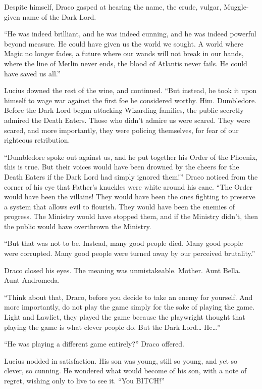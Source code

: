 Despite himself, Draco gasped at hearing the name, the crude, vulgar, Muggle-given name of the Dark Lord.

“He was indeed brilliant, and he was indeed cunning, and he was indeed powerful beyond measure. He could have given us the world we sought. A world where Magic no longer fades, a future where our wands will not break in our hands, where the line of Merlin never ends, the blood of Atlantis never fails. He could have saved us all.”

Lucius downed the rest of the wine, and continued. “But instead, he took it upon himself to wage war against the first foe he considered worthy. Him. Dumbledore. Before the Dark Lord began attacking Wizarding families, the public secretly admired the Death Eaters. Those who didn’t admire us were scared. They were scared, and more importantly, they were policing themselves, for fear of our righteous retribution.

“Dumbledore spoke out against us, and he put together his Order of the Phoenix, this is true. But their voices would have been drowned by the cheers for the Death Eaters if the Dark Lord had simply ignored them!” Draco noticed from the corner of his eye that Father’s knuckles were white around his cane. “The Order would have been the villains! They would have been the ones fighting to preserve a system that allows evil to flourish. They would have been the enemies of progress. The Ministry would have stopped them, and if the Ministry didn’t, then the public would have overthrown the Ministry.

“But that was not to be. Instead, many good people died. Many good people were corrupted. Many good people were turned away by our perceived brutality.”

Draco closed his eyes. The meaning was unmistakeable. Mother. Aunt Bella. Aunt Andromeda.

“Think about that, Draco, before you decide to take an enemy for yourself. And more importantly, do not play the game simply for the sake of playing the game. Light and Lawliet, they played the game because the playwright thought that playing the game is what clever people do. But the Dark Lord… He…”

“He was playing a different game entirely?” Draco offered.

Lucius nodded in satisfaction. His son was young, still so young, and yet so clever, so cunning. He wondered what would become of his son, with a note of regret, wishing only to live to see it.
\simpleline
{}
“You BITCH!”

